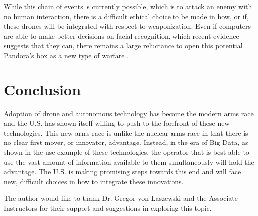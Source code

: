 \documentclass[sigconf]{acmart}
\begin{document}
While this chain of events is currently possible, which is to attack an enemy with no human interaction, there is a difficult ethical choice to be made in how, or if, these drones will be integrated with respect to weaponization. Even if computers are able to make better decisions on facial recognition, which recent evidence suggests that they can, there remains a large reluctance to open this potential Pandora's box as a new type of warfare \cite{googleface}. 

\section{Conclusion}
Adoption of drone and autonomous technology has become the modern arms race and the U.S. has shown itself willing to push to the forefront of these new technologies. This new arms race is unlike the nuclear arms race in that there is no clear first mover, or innovator, advantage. Instead, in the era of Big Data, as shown in the use example of these technologies, the operator that is best able to use the vast amount of information available to them simultaneously will hold the advantage. The U.S. is making promising steps towards this end and will face new, difficult choices in how to integrate these innovations.


 
 
 
\begin{acks}
The author would like to thank Dr. Gregor von Laszewski and the Associate Instructors for their support and suggestions in exploring this topic.
\end{acks}


 

%
\end{document}
